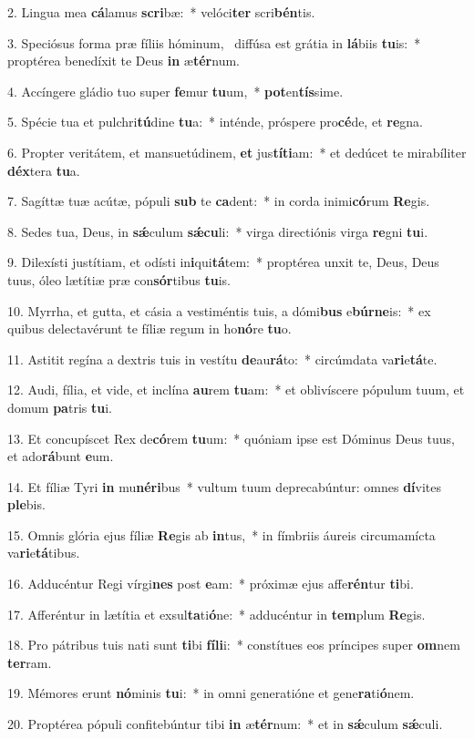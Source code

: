 2. Lingua mea \textbf{cá}lamus \textbf{scri}bæ:~*  velóci\textbf{ter} scri\textbf{bén}tis.\

3. Speciósus forma præ fíliis hóminum, \dag\  diffúsa est grátia in \textbf{lá}biis \textbf{tu}is:~*  proptérea benedíxit te Deus \textbf{in} æ\textbf{tér}num.\

4. Accíngere gládio tuo super \textbf{fe}mur \textbf{tu}um,~*  \textbf{pot}en\textbf{tís}sime.\

5. Spécie tua et pulchri\textbf{tú}dine \textbf{tu}a:~*  inténde, próspere pro\textbf{cé}de, et \textbf{re}gna.\

6. Propter veritátem, et mansuetúdinem, \textbf{et} jus\textbf{tí}\textbf{ti}am:~*  et dedúcet te mirabíliter \textbf{déx}tera \textbf{tu}a.\

7. Sagíttæ tuæ acútæ, pópuli \textbf{sub} te \textbf{ca}dent:~*  in corda inimi\textbf{có}rum \textbf{Re}gis.\

8. Sedes tua, Deus, in \textbf{sǽ}culum \textbf{sǽ}\textbf{cu}li:~*  virga directiónis virga \textbf{re}gni \textbf{tu}i.\

9. Dilexísti justítiam, et odísti in\textbf{i}qui\textbf{tá}tem:~*  proptérea unxit te, Deus, Deus tuus, óleo lætítiæ præ con\textbf{sór}tibus \textbf{tu}is.\

10. Myrrha, et gutta, et cásia a vestiméntis tuis, a dómi\textbf{bus} e\textbf{búr}\textbf{ne}is:~*  ex quibus delectavérunt te fíliæ regum in ho\textbf{nó}re \textbf{tu}o.\

11. Astitit regína a dextris tuis in vestítu \textbf{de}au\textbf{rá}to:~*  circúmdata va\textbf{ri}e\textbf{tá}te.\

12. Audi, fília, et vide, et inclína \textbf{au}rem \textbf{tu}am:~*  et oblivíscere pópulum tuum, et domum \textbf{pa}tris \textbf{tu}i.\

13. Et concupíscet Rex de\textbf{có}rem \textbf{tu}um:~*  quóniam ipse est Dóminus Deus tuus, et ado\textbf{rá}bunt \textbf{e}um.\

14. Et fíliæ Tyri \textbf{in} mu\textbf{né}\textbf{ri}bus~*  vultum tuum deprecabúntur: omnes \textbf{dí}vites \textbf{ple}bis.\

15. Omnis glória ejus fíliæ \textbf{Re}gis ab \textbf{in}tus,~*  in fímbriis áureis circumamícta va\textbf{ri}e\textbf{tá}tibus.\

16. Adducéntur Regi vírgi\textbf{nes} post \textbf{e}am:~*  próximæ ejus affe\textbf{rén}tur \textbf{ti}bi.\

17. Afferéntur in lætítia et exsul\textbf{ta}ti\textbf{ó}ne:~*  adducéntur in \textbf{tem}plum \textbf{Re}gis.\

18. Pro pátribus tuis nati sunt \textbf{ti}bi \textbf{fí}\textbf{li}i:~*  constítues eos príncipes super \textbf{om}nem \textbf{ter}ram.\

19. Mémores erunt \textbf{nó}minis \textbf{tu}i:~*  in omni generatióne et gene\textbf{ra}ti\textbf{ó}nem.\

20. Proptérea pópuli confitebúntur tibi \textbf{in} æ\textbf{tér}num:~*  et in \textbf{sǽ}culum \textbf{sǽ}culi.\

